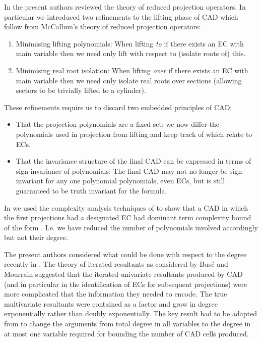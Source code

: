 \documentclass{llncs}
\begin{document}
In \cite{EBD15} the present authors reviewed the theory of reduced projection operators.  In particular we introduced two refinements to the lifting phase of CAD which follow from  McCallum's theory of reduced projection operators:
\begin{enumerate}
\item Minimising lifting polynomials: When lifting \emph{to}  if there exists an EC with main variable  then we need only lift with respect to (isolate roots of) this.  
\item Minimising real root isolation: When lifting \emph{over}  if there exists an EC with main variable  then we need only isolate real roots over sections (allowing sectors to be trivially lifted to a cylinder).
\end{enumerate}
These refinements require us to discard two embedded principles of CAD:
\begin{itemize}
\item That the projection polynomials are a fixed set: we now differ the polynomials used in projection from lifting and keep track of which relate to ECs. 
\item That the invariance structure of the final CAD can be expressed in terms of sign-invariance of polynomials:  The final CAD may not no longer be sign-invariant for any one polynomial polynomials, even ECs, but is still guaranteed to be truth invariant for the formula.  
\end{itemize}

In \cite[Section 5]{EBD15} we used the complexity analysis techniques of \cite{BDEMW16} to show that a CAD in which the first  projections had a designated EC had dominant term complexity bound of the form .  I.e. we have reduced the number of polynomials involved accordingly but not their degree.

The present authors considered what could be done with respect to the degree recently in \cite{ED16}.  The theory of iterated resultants as considered by Bus\'{e} and Mourrain \cite{BM09} suggested that the iterated univariate resultants produced by CAD (and in particular in the identification of ECs for subsequent projections) were more complicated that the information they needed to encode.  The true multivariate resultants were contained as a factor and grow in degree exponentially rather than doubly exponentially.  The key result had to be adapted from \cite{BM09} to change the arguments from total degree in all variables to the degree in at most one variable required for bounding the number of CAD cells produced.
\end{document}
